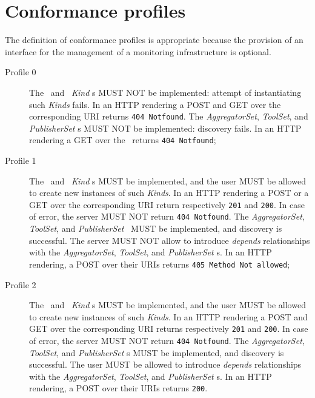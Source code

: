 \documentclass[12pt]{article}  %
\begin{document}

\section{Conformance profiles}

The definition of conformance profiles is appropriate because the provision of an interface for the management of a monitoring infrastructure is optional. 

\begin{description}

\item[Profile 0] The \coll\ and \sens\ {\em Kind} s MUST NOT be implemented: attempt of instantiating such {\em Kinds} fails.  In an HTTP rendering a POST and GET over the corresponding URI returns {\tt 404 Notfound}. The {\em AggregatorSet}, {\em ToolSet}, and {\em PublisherSet} \mi s MUST NOT be implemented: discovery fails. In an HTTP rendering a GET over the \mi\ returns {\tt 404 Notfound}; 

\item[Profile 1] The \coll\ and \sens\ {\em Kind} s MUST be implemented, and the user MUST be allowed to create new instances of such {\em Kinds}.  In an HTTP rendering a POST or a GET over the corresponding URI return respectively {\tt 201} and {\tt 200}. In case of error, the server MUST NOT return {\tt 404 Notfound}. The {\em AggregatorSet}, {\em ToolSet}, and {\em PublisherSet} \mi\ MUST be implemented, and discovery is successful. The server MUST NOT allow to introduce {\em depends} relationships with the {\em AggregatorSet}, {\em ToolSet}, and {\em PublisherSet} \mi s. In an HTTP rendering, a POST over their URIs returns {\tt 405 Method Not allowed}; 

\item[Profile 2]  The \coll\ and \sens\ {\em Kind} s MUST be implemented, and the user MUST be allowed to create new instances of such {\em Kinds}.  In an HTTP rendering a POST and GET over the corresponding URI returns respectively {\tt 201} and {\tt 200}. In case of error, the server MUST NOT return {\tt 404 Notfound}. The {\em AggregatorSet}, {\em ToolSet}, and {\em PublisherSet} \mi s MUST be implemented, and discovery is successful. The user MUST be allowed to introduce {\em depends} relationships with the  {\em AggregatorSet}, {\em ToolSet}, and {\em PublisherSet} \mi s. In an HTTP rendering, a POST over their URIs returns {\tt 200}.

\end{description}
\end{document}
